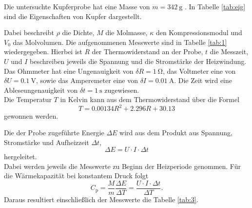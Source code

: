 Die untersuchte Kupferprobe hat eine Masse von $m = \SI{342}{\gram}$ \cite{skript}.
In Tabelle \ref{tab:eig} sind die Eigenschaften von Kupfer dargestellt.

%

Dabei beschreibt $\rho$ die Dichte, $M$ die Molmasse, $\kappa$ den Kompressionsmodul und $V_0$ das Molvolumen.
Die aufgenommenen Messwerte sind in Tabelle \ref{tab:1} wiedergegeben.
Hierbei ist $R$ der Thermowiderstand an der Probe, $t$ die Messzeit, $U$ und $I$ beschreiben jeweils die Spannung und die Stromstärke der Heizwindung.
Das Ohmmeter hat eine Ungenauigkeit von $\delta R = \SI{1}{\ohm}$, das Voltmeter eine von $\delta U = \SI{0.1}{\volt}$, sowie das Amperemeter eine von $\delta I = \SI{0.01}{\ampere}$.
Die Zeit wird eine Ableseungenauigkeit von $\delta t = \SI{1}{\second}$ zugewiesen.\\
Die Temperatur $T$ in Kelvin kann aus dem Thermowiderstand über die Formel
\begin{equation}
  T = 0.00134R^2+2.296R+30.13
\end{equation}
gewonnen werden.


Die der Probe zugeführte Energie $\Delta E$ wird aus dem Produkt aus Spannung, Stromstärke und Aufheizzeit $\Delta t$,
\begin{equation}
  \Delta E =  U\cdot I\cdot \Delta t
\end{equation}
hergeleitet.\\
Dabei werden jeweils die Messwerte zu Beginn der Heizperiode genommen.
Für die Wärmekapazität bei konstantem Druck folgt
\begin{equation}
  C_{\text{p}} = \frac{M}{m}\frac{\Delta E}{\Delta T} = \frac{U\cdot I\cdot \Delta t}{\Delta T}.
\end{equation}
Daraus resultiert einschließlich der Messwerte die Tabelle \ref{tab:3}.








